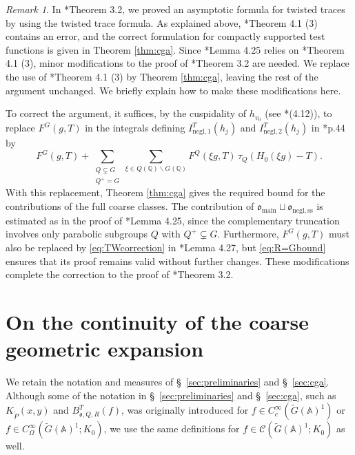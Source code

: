 \documentclass[12pt]{amsart}
\theoremstyle{definition}
\theoremstyle{plain}
\theoremstyle{remark}
\newtheorem{remark}[definition]{Remark}
\def\Q{\mathbb{Q}}%
\def\A{\mathbb{A}}%
\def\inf{\infty}
\def\bs{\backslash}%
\newcommand{\fo}{\mathfrak{o}}
\newcommand{\cC}{\mathcal{C}}
\numberwithin{equation}{section}
\newcommand{\tG}{\widetilde{G}}
\newcommand{\tP}{\widetilde{P}}
\begin{document}
\begin{remark}\label{rem:TW}
In \cite{TW26}*{Theorem 3.2}, we proved an asymptotic formula for twisted traces by using the twisted trace formula. 
As explained above, \cite{Par19}*{Theorem 4.1 (3)} contains an error, and the correct formulation for compactly supported test functions is given in Theorem \ref{thm:cga}.
Since \cite{TW26}*{Lemma 4.25} relies on \cite{Par19}*{Theorem 4.1 (3)}, minor modifications to the proof of \cite{TW26}*{Theorem 3.2} are needed.
We replace the use of \cite{Par19}*{Theorem 4.1 (3)} by Theorem \ref{thm:cga}, leaving the rest of the argument unchanged.
We briefly explain how to make these modifications here.    

To correct the argument, it suffices, by the cuspidality of $h_{v_0}$ (see \cite{TW26}*{(4.12)}), to replace $F^G(g,T)$ in the integrals defining $I^T_{\mathrm{negl},1}(h_j)$ and $I^T_{\mathrm{negl},2}(h_j)$ in \cite{TW26}*{p.44} by
\begin{equation}\label{eq:TWcorrection}
F^G(g,T)+\sum_{\substack{Q\subsetneq G \\ Q^+=G}}\sum_{\xi\in Q(\Q)\bs G(\Q)}F^Q(\xi g,T)\, \tau_Q(H_0(\xi g)-T).
\end{equation}
With this replacement, Theorem \ref{thm:cga} gives the required bound for the contributions of the full coarse classes. The contribution of $\fo_{\mathrm{main}}\sqcup\fo_{\mathrm{negl,ss}}$ is estimated as in the proof of \cite{TW26}*{Lemma 4.25}, since the complementary truncation involves only parabolic subgroups $Q$ with $Q^+\subsetneq G$.
Furthermore, $F^G(g,T)$ must also be replaced by \eqref{eq:TWcorrection} in \cite{TW26}*{Lemma 4.27}, but \eqref{eq:R=Gbound} ensures that its proof remains valid without further changes.
These modifications complete the correction to the proof of \cite{TW26}*{Theorem 3.2}.
\end{remark}





\section{On the continuity of the coarse geometric expansion}
\label{gr:section}

We retain the notation and measures of \S~\ref{sec:preliminaries} and \S~\ref{sec:cga}.
Although some of the notation in \S~\ref{sec:preliminaries} and \S~\ref{sec:cga}, such as $K_{\tP}(x,y)$ and $B^T_{\fo,Q,R}(f)$, was originally introduced for $f\in C^\inf_c(\tG(\A)^1)$ or $f\in C^\inf_\Omega(\tG(\A)^1;K_0)$, we use the same definitions for $f\in \cC(\tG(\A)^1;K_0)$ as well.
\end{document}
